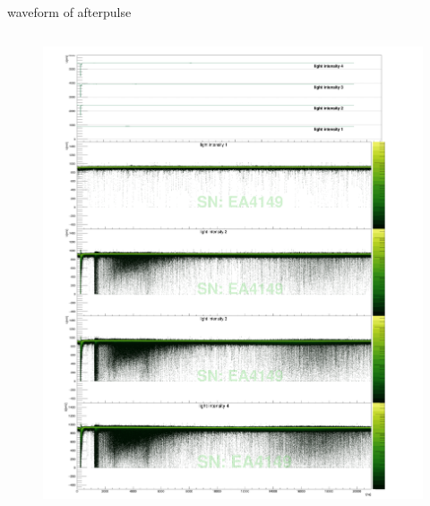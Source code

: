 \documentclass[11pt,compress,xcolor=x11names,UTF8]{beamer}
\begin{document}
\begin{frame}{waveform of afterpulse}
\begin{columns}
\begin{column}{.485\textwidth}
\begin{figure}
\includegraphics[width=1.049\textwidth]{figure/EA4149_avewave.png} %
\end{figure}
\end{column}
\end{columns}
\end{frame}
\end{document}
